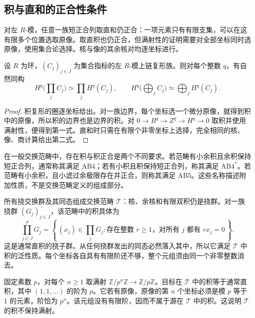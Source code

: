 \subsection{积与直和的正合性条件}
\label{b4:subsec:1301:03}

对左 \(R\)-模，任意一族短正合列取直和仍正合：一项元素只有有限支集，可以在这有限多个位置选取原像。取直积也仍正合，但满射性的证明需要对全部坐标同时选原像，使用集合论选择。核与像的其余核对均逐坐标进行。

\begin{proposition}\label{b4:prop:products-cohomology}
	设 \(R\) 为环，\((C_j)_{j\in J}\) 为集合指标的左 \(R\)-模上链复形族。则对每个整数 \(q\)，有自然同构
	\[
		H^q\bigl(\prod_j C_j\bigr)\simeq\prod_jH^q(C_j),\qquad H^q\bigl(\bigoplus_j C_j\bigr)\simeq\bigoplus_jH^q(C_j).
	\]
\end{proposition}
\begin{proof}
	积复形的圈逐坐标给出。对一族边界，每个坐标选一个微分原像，就得到积中的原像，所以积的边界也是边界的积。对 \(0\to B^q\to Z^q\to H^q\to0\) 取积并使用满射性，便得到第一式。直和时只需在有限个非零坐标上选择，完全相同的核、像、商计算给出第二式。
\end{proof}

在一般交换范畴中，存在积与积正合是两个不同要求。若范畴有小余积且余积保持短正合列，通常称其满足 \(\mathrm{AB4}\)；若有小积且积保持短正合列，称其满足 \(\mathrm{AB4}^*\)。若范畴有小余积，且小滤过余极限存在并正合，则称其满足 \(\mathrm{AB5}\)。这些名称描述附加性质，不是交换范畴定义的组成部分。

\begin{example}\label{b4:exm:torsion-category-product}
	所有挠交换群及其同态组成交换范畴 \(\mathcal T\)：核、余核和有限双积仍是挠群。对一族挠群 \((G_j)_{j\in J}\)，该范畴中的积具体为
	\[
		\prod_{j\in J}^{\mathcal T}G_j =\left\{\,(x_j)\in\prod_jG_j: \text{存在整数 }r\ge1\text{，对所有 }j\text{ 都有 }rx_j=0\,\right\}.
	\]
	这是通常直积的挠子群。从任何挠群发出的同态必然落入其中，所以它满足 \(\mathcal T\) 中积的泛性质。每个坐标各自具有有限阶还不够，整个元组须由同一个非零整数消去。

	\ProseParagraphBreak
	固定素数 \(p\)，对每个 \(n\ge1\) 取满射 \(\mathbb Z/p^n\mathbb Z\to\mathbb Z/p\mathbb Z\)。目标在 \(\mathcal T\) 中的积等于通常直积，其中 \((1,1,\ldots)\) 的阶为 \(p\)。它若有原像，原像的第 \(n\) 个坐标必须是模 \(p\) 等于 \(1\) 的元素，阶恰为 \(p^n\)。该元组没有有限阶，因而不属于源在 \(\mathcal T\) 中的积。这说明 \(\mathcal T\) 的积不保持满射。
\end{example}

